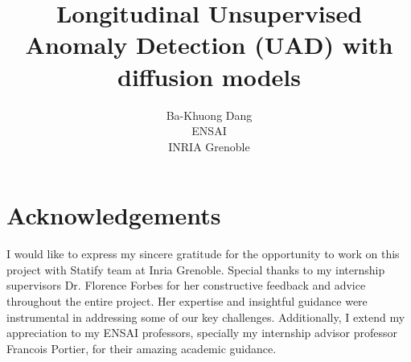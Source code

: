 \documentclass[11pt, a4paper, openany]{book}
\title{Longitudinal Unsupervised Anomaly Detection (UAD) with diffusion models}
\author{ Ba-Khuong Dang\\
  ENSAI\\
INRIA Grenoble }
\date{}
\begin{document}

\setcounter{page}{1}

\frontmatter
\maketitle



\chapter*{Acknowledgements}
I would like to express my sincere gratitude for the opportunity to work on this
project with Statify team at Inria Grenoble. Special thanks to my internship supervisors Dr. Florence Forbes
for her constructive feedback and advice throughout the entire project. Her expertise and insightful guidance were instrumental in addressing some of our key challenges. Additionally, I extend my appreciation to my ENSAI professors, specially my internship advisor professor Francois Portier, for their amazing academic guidance.
\clearpage

\tableofcontents

\end{document}
